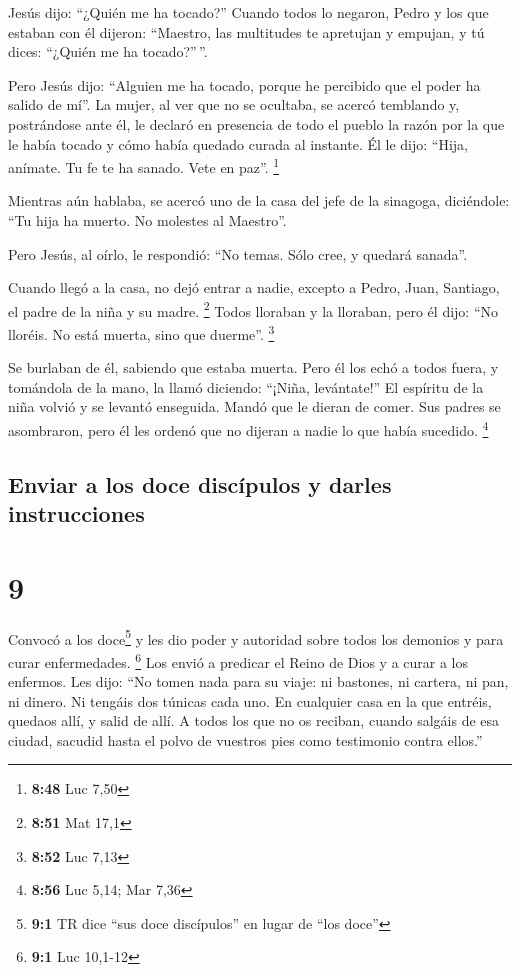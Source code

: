  Jesús dijo: ``¿Quién me ha tocado?'' Cuando todos lo
negaron, Pedro y los que estaban con él dijeron: ``Maestro, las
multitudes te apretujan y empujan, y tú dices: ``¿Quién me ha
tocado?''\,''.

 Pero Jesús dijo: ``Alguien me ha tocado, porque he
percibido que el poder ha salido de mí''.  La mujer, al
ver que no se ocultaba, se acercó temblando y, postrándose ante él, le
declaró en presencia de todo el pueblo la razón por la que le había
tocado y cómo había quedado curada al instante.  Él le
dijo: ``Hija, anímate. Tu fe te ha sanado. Vete en paz''. \footnote{\textbf{8:48}
  Luc 7,50}

 Mientras aún hablaba, se acercó uno de la casa del jefe
de la sinagoga, diciéndole: ``Tu hija ha muerto. No molestes al
Maestro''.

 Pero Jesús, al oírlo, le respondió: ``No temas. Sólo
cree, y quedará sanada''.

 Cuando llegó a la casa, no dejó entrar a nadie, excepto
a Pedro, Juan, Santiago, el padre de la niña y su madre. \footnote{\textbf{8:51}
  Mat 17,1}  Todos lloraban y la lloraban, pero él dijo:
``No lloréis. No está muerta, sino que duerme''. \footnote{\textbf{8:52}
  Luc 7,13}

 Se burlaban de él, sabiendo que estaba muerta.
 Pero él los echó a todos fuera, y tomándola de la mano,
la llamó diciendo: ``¡Niña, levántate!''  El espíritu de
la niña volvió y se levantó enseguida. Mandó que le dieran de comer.
 Sus padres se asombraron, pero él les ordenó que no
dijeran a nadie lo que había sucedido. \footnote{\textbf{8:56} Luc 5,14;
  Mar 7,36}

\hypertarget{enviar-a-los-doce-discuxedpulos-y-darles-instrucciones}{%
\subsection{Enviar a los doce discípulos y darles
instrucciones}\label{enviar-a-los-doce-discuxedpulos-y-darles-instrucciones}}

\hypertarget{section-8}{%
\section{9}\label{section-8}}

 Convocó a los doce\footnote{\textbf{9:1} TR dice ``sus
  doce discípulos'' en lugar de ``los doce''} y les dio poder y
autoridad sobre todos los demonios y para curar enfermedades.
\footnote{\textbf{9:1} Luc 10,1-12}  Los envió a predicar
el Reino de Dios y a curar a los enfermos.  Les dijo: ``No
tomen nada para su viaje: ni bastones, ni cartera, ni pan, ni dinero. Ni
tengáis dos túnicas cada uno.  En cualquier casa en la que
entréis, quedaos allí, y salid de allí.  A todos los que
no os reciban, cuando salgáis de esa ciudad, sacudid hasta el polvo de
vuestros pies como testimonio contra ellos.''

